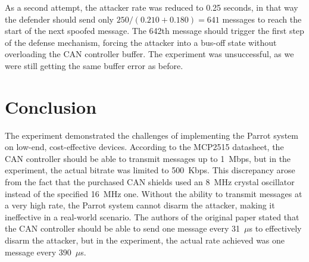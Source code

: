 \documentclass[10pt,twocolumn,letterpaper]{article}
\begin{document}
As a second attempt, the attacker rate was reduced to 0.25 seconds, in that way the defender should send only $250/(0.210 + 0.180) = 641$ messages to reach the start of the next spoofed message.
The 642th message should trigger the first step of the defense mechanism, forcing the attacker into a bus-off state without overloading the CAN controller buffer.
The experiment was unsuccessful, as we were still getting the same buffer error as before.


\section{Conclusion}

The experiment demonstrated the challenges of implementing the Parrot system on low-end, cost-effective devices.
According to the MCP2515 datasheet, the CAN controller should be able to transmit messages up to 1~Mbps, but in the experiment, the actual bitrate was limited to 
500~Kbps. This discrepancy arose from the fact that the purchased CAN shields used an 8~MHz crystal oscillator instead of the specified 16~MHz one.
Without the ability to transmit messages at a very high rate, the Parrot system cannot disarm the attacker, making it ineffective in a real-world scenario.
The authors of the original paper stated that the CAN controller should be able to send one message every 31~$\mu$s to effectively disarm the attacker, but in the experiment, the actual rate achieved was one message every 390~$\mu$s.



{\small
    
    
}
\end{document}
